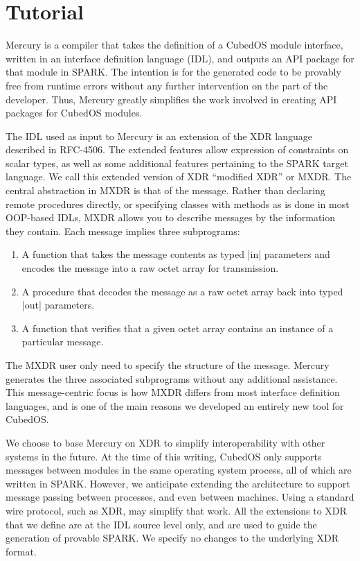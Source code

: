 \section{Tutorial}
\label{sec:mercury-tutorial}

Mercury is a compiler that takes the definition of a CubedOS module interface, written in an
interface definition language (IDL), and outputs an API package for that module in SPARK. The
intention is for the generated code to be provably free from runtime errors without any further
intervention on the part of the developer. Thus, Mercury greatly simplifies the work involved in
creating API packages for CubedOS modules.

The IDL used as input to Mercury is an extension of the XDR language described in RFC-4506. The
extended features allow expression of constraints on scalar types, as well as some additional
features pertaining to the SPARK target language. We call this extended version of XDR
``modified XDR'' or MXDR. The central abstraction in MXDR is that of the message. Rather than
declaring remote procedures directly, or specifying classes with methods as is done in most
OOP-based IDLs, MXDR allows you to describe messages by the information they contain. Each
message implies three subprograms:

\begin{enumerate}
\item A function that takes the message contents as typed |in| parameters and encodes the
message into a raw octet array for transmission.

\item A procedure that decodes the message as a raw octet array back into typed |out|
parameters.

\item A function that verifies that a given octet array contains an instance of a particular
message.
\end{enumerate}

The MXDR user only need to specify the structure of the message. Mercury generates the three
associated subprograms without any additional assistance. This message-centric focus is how MXDR
differs from most interface definition languages, and is one of the main reasons we developed an
entirely new tool for CubedOS.

We choose to base Mercury on XDR to simplify interoperability with other systems in the future.
At the time of this writing, CubedOS only supports messages between modules in the same
operating system process, all of which are written in SPARK. However, we anticipate extending
the architecture to support message passing between processes, and even between machines. Using
a standard wire protocol, such as XDR, may simplify that work. All the extensions to XDR that we
define are at the IDL source level only, and are used to guide the generation of provable SPARK.
We specify no changes to the underlying XDR format.

